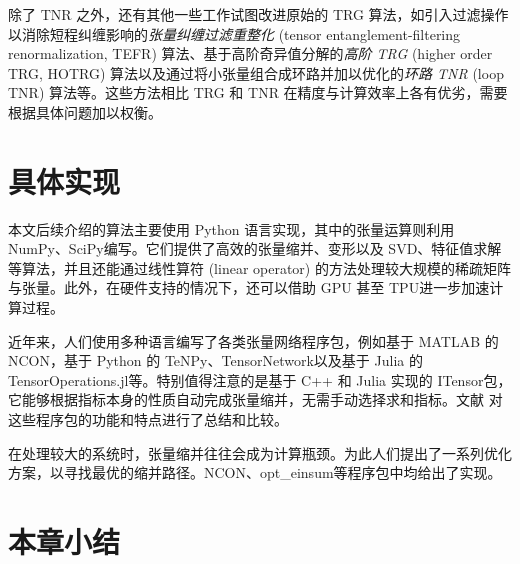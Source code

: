 除了 TNR 之外，还有其他一些工作试图改进原始的 TRG 算法，如引入过滤操作以消除短程纠缠影响的\emph{张量纠缠过滤重整化} (tensor entanglement-filtering renormalization, TEFR) 算法\cite{gu2009tensor1}、基于高阶奇异值分解的\emph{高阶 TRG} (higher order TRG, HOTRG) 算法\cite{xie2012coarse}以及通过将小张量组合成环路并加以优化的\emph{环路 TNR} (loop TNR) 算法\cite{yang2017loop}等。这些方法相比 TRG 和 TNR 在精度与计算效率上各有优劣，需要根据具体问题加以权衡。

\section{具体实现}

本文后续介绍的算法主要使用 Python 语言实现，其中的张量运算则利用 NumPy\cite{harris2020array}、SciPy\cite{virtanen2020scipy}编写。它们提供了高效的张量缩并、变形以及 SVD、特征值求解等算法，并且还能通过线性算符 (linear operator) 的方法处理较大规模的稀疏矩阵与张量。此外，在硬件支持的情况下，还可以借助 GPU 甚至 TPU\cite{ganahl2023density}进一步加速计算过程。

近年来，人们使用多种语言编写了各类张量网络程序包，例如基于 MATLAB 的 NCON\cite{pfeifer2014ncon}，基于 Python 的 TeNPy\cite{hauschild2018efficient}、TensorNetwork\cite{roberts2019tensornetwork}以及基于 Julia 的 TensorOperations.jl\cite{jutho2023tensoroperations}等。特别值得注意的是基于 C++ 和 Julia 实现的 ITensor\cite{fishman2022itensor}包，它能够根据指标本身的性质自动完成张量缩并，无需手动选择求和指标。文献 \parencite{psarras2021landscape} 对这些程序包的功能和特点进行了总结和比较。

在处理较大的系统时，张量缩并往往会成为计算瓶颈。为此人们提出了一系列优化方案\cite{pfeifer2014faster,evenbly2014improving}，以寻找最优的缩并路径。NCON、opt\_einsum\cite{daniel2018opteinsum}等程序包中均给出了实现。

\section{本章小结}
